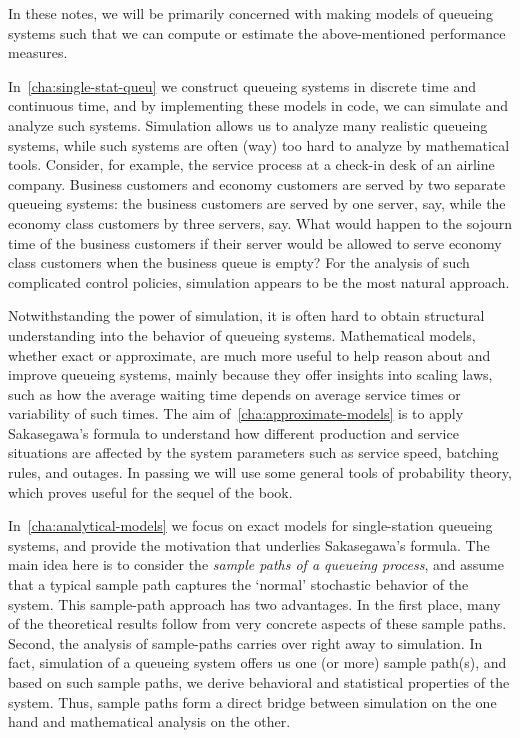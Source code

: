 \documentclass[companion]{subfiles}
\begin{document}
In these notes, we will be primarily concerned with making models of queueing systems such that we can compute or estimate the above-mentioned performance measures.

In~\cref{cha:single-stat-queu} we construct queueing systems in discrete time and continuous time, and by implementing these models in code, we can simulate and analyze such systems.
Simulation allows us to analyze many realistic queueing systems, while such systems are often (way) too hard to analyze by mathematical tools.
Consider, for example, the service process at a check-in desk of an airline company.
Business customers and economy customers are served by two separate queueing systems: the business customers are served by one server, say, while the economy class customers by three servers, say.
What would happen to the sojourn time of the business customers if their server would be allowed to serve economy class customers when the business queue is empty?
For the analysis of such complicated control policies, simulation appears to be the most natural approach.

Notwithstanding the power of simulation, it is often hard to obtain structural understanding into the behavior of queueing systems.
Mathematical models, whether exact or approximate, are much more useful to help reason about and improve queueing systems, mainly because they offer insights into scaling laws, such as how the average waiting time depends on average service times or variability of such times.
The aim of~\cref{cha:approximate-models} is to apply Sakasegawa's formula to understand how different production and service situations are affected by the system parameters such as service speed, batching rules, and outages.
In passing we will use some general tools of probability theory, which proves useful for the sequel of the book.

In~\cref{cha:analytical-models} we focus on exact models for single-station queueing systems, and provide the motivation that underlies Sakasegawa's formula.
The main idea here is to consider the \emph{sample paths of a queueing process}, and assume that a typical sample path captures the `normal' stochastic behavior of the system.
This sample-path approach has two advantages.
In the first place, many of the theoretical results follow from very concrete aspects of these sample paths.
Second, the analysis of sample-paths carries over right away to simulation.
In fact, simulation of a queueing system offers us one (or more) sample path(s), and based on such sample paths, we derive behavioral and statistical properties of the system.
Thus, sample paths form a direct bridge between simulation on the one hand and mathematical analysis on the other.
\end{document}
